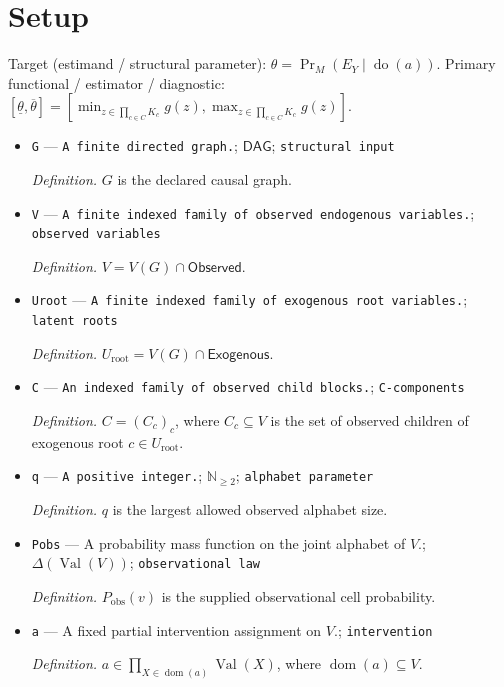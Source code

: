 \documentclass{article}
\begin{document}
\section{Setup}

Target (estimand / structural parameter): \(\theta=\Pr_M(E_Y\mid\operatorname{do}(a))\).
Primary functional / estimator / diagnostic: \([\underline\theta,\overline\theta]=[\min_{z\in\prod_{c\in C}K_c}g(z),\max_{z\in\prod_{c\in C}K_c}g(z)]\).
\begin{itemize}
  \item \texttt{G} --- \texttt{A finite directed graph.}; \(\mathsf{DAG}\); \texttt{structural input}
  \par\smallskip\noindent\emph{Definition.} \(G\) is the declared causal graph.
  \item \texttt{V} --- \texttt{A finite indexed family of observed endogenous variables.}; \texttt{observed variables}
  \par\smallskip\noindent\emph{Definition.} \(V=V(G)\cap\mathsf{Observed}\).
  \item \texttt{Uroot} --- \texttt{A finite indexed family of exogenous root variables.}; \texttt{latent roots}
  \par\smallskip\noindent\emph{Definition.} \(U_{\mathrm{root}}=V(G)\cap\mathsf{Exogenous}\).
  \item \texttt{C} --- \texttt{An indexed family of observed child blocks.}; \texttt{C-\allowbreak{}components}
  \par\smallskip\noindent\emph{Definition.} \(C=(C_c)_c\), where \(C_c\subseteq V\) is the set of observed children of exogenous root \(c\in U_{\mathrm{root}}\).
  \item \texttt{q} --- \texttt{A positive integer.}; \(\mathbb N_{\ge 2}\); \texttt{alphabet parameter}
  \par\smallskip\noindent\emph{Definition.} \(q\) is the largest allowed observed alphabet size.
  \item \texttt{Pobs} --- A probability mass function on the joint alphabet of \(V\).; \(\Delta(\operatorname{Val}(V))\); \texttt{observational law}
  \par\smallskip\noindent\emph{Definition.} \(P_{\mathrm{obs}}(v)\) is the supplied observational cell probability.
  \item \texttt{a} --- A fixed partial intervention assignment on \(V\).; \texttt{intervention}
  \par\smallskip\noindent\emph{Definition.} \(a\in\prod_{X\in\operatorname{dom}(a)}\operatorname{Val}(X)\), where \(\operatorname{dom}(a)\subseteq V\).

\end{itemize}
\end{document}
